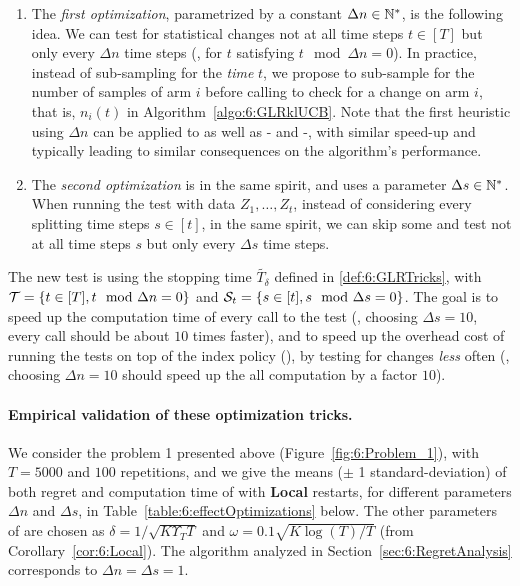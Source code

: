 \begin{enumerate}
    \item
    The \emph{first optimization}, parametrized by a constant $\Delta n \in\mathbb{N}^*$, is the following idea.
    We can test for statistical changes not at all time steps $t\in[T]$ but only every $\Delta n$ time steps (\ie, for $t$ satisfying $t \mod \Delta n = 0$).
    In practice, instead of sub-sampling for the \emph{time} $t$, we propose to sub-sample for the number of samples of arm $i$ before calling \GLR{} to check for a change on arm $i$, that is, $n_i(t)$ in Algorithm~\ref{algo:6:GLRklUCB}.
    Note that the first heuristic using $\Delta n$ can be applied to \MUCB{} as well as \CUSUM-\UCB{} and \PHT-\UCB{}, with similar speed-up and typically leading to similar consequences on the algorithm's performance.

    \item
    The \emph{second optimization} is in the same spirit, and uses a parameter $\Delta s \in\mathbb{N}^*$.
    When running the \GLR{} test with data $Z_1,\dots,Z_t$, instead of considering every splitting time steps $s\in[t]$, in the same spirit, we can skip some and test not at all time steps $s$ but only every $\Delta s$ time steps.
\end{enumerate}


The new \GLR{} test is using the stopping time $\widetilde{T_\delta}$ defined in \eqref{def:6:GLRTricks},
with $\mathcal{T} = \{t \in [T], t \mod \Delta n = 0\}$
and $\mathcal{S}_t = \{s \in [t], s \mod \Delta s = 0\}$.
The goal is to speed up the computation time of every call to the \GLR{} test (\eg, choosing $\Delta s = 10$, every call should be about $10$ times faster), and to speed up the overhead cost of running the tests on top of the index policy (\klUCB), by testing for changes \emph{less} often (\eg, choosing $\Delta n = 10$ should speed up the all computation by a factor $10$).

\paragraph{Empirical validation of these optimization tricks.}
%
We consider the problem 1 presented above (Figure~\ref{fig:6:Problem_1}), with $T=5000$ and $100$ repetitions, and we give the means ($\pm$ 1 standard-deviation) of both regret and computation time of \GLRklUCB{} with \textbf{Local} restarts, for different parameters $\Delta n$ and $\Delta s$, in Table~\ref{table:6:effectOptimizations} below.
The other parameters of \GLRklUCB{} are chosen as $\delta = 1/\sqrt{K \Upsilon_T T}$ and $\omega = 0.1\sqrt{K\log(T)/T}$ (from Corollary~\ref{cor:6:Local}).
The algorithm analyzed in Section~\ref{sec:6:RegretAnalysis} corresponds to $\Delta n = \Delta s = 1$.


